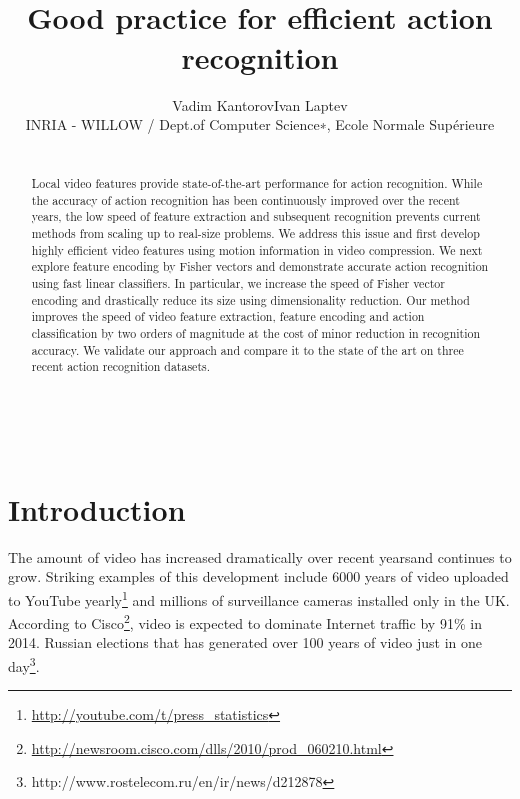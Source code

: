 \documentclass[10pt,twocolumn,letterpaper]{article}
\begin{document}
\title{\mbox{}\vspace{-1cm}\\Good practice for efficient action
recognition\vspace{-.2cm}\\}

\author{Vadim Kantorov\qquad Ivan Laptev\\INRIA - WILLOW / Dept.of Computer Science∗, Ecole Normale Supérieure}

\maketitle

\begin{abstract}
\mbox{}\vspace{-.6cm}\\
Local video features provide state-of-the-art performance for action recognition. While the accuracy of action recognition has been continuously improved over the recent years, the low speed of feature extraction and subsequent recognition prevents current methods from scaling up to real-size problems. We address this issue and first develop highly efficient video features using motion information in video compression. We next explore feature encoding by Fisher vectors and demonstrate accurate action recognition using fast linear classifiers. In particular, we increase the speed of Fisher vector encoding and drastically reduce its size using dimensionality reduction. Our method improves the speed of video feature extraction, feature encoding and action classification by two orders of magnitude at the cost of minor reduction in recognition accuracy. We validate our approach and compare it to the state of the art on three recent action recognition datasets.
\end{abstract}

\mbox{}\vspace{-1.3cm}\\


\section{Introduction}

The amount of video has increased dramatically over recent yearsand continues to grow. Striking examples of this development
include 6000 years of video uploaded to YouTube
yearly\footnote{\scriptsize
\url{http://youtube.com/t/press\_statistics}} and millions of
surveillance cameras installed only in the UK. According to
Cisco\footnote{\scriptsize
\url{http://newsroom.cisco.com/dlls/2010/prod_060210.html}},
video is expected to dominate Internet traffic by 91\% in 2014.
Russian elections that has generated over 100 years of video
just in one
day\footnote{http://www.rostelecom.ru/en/ir/news/d212878}.
\end{document}
